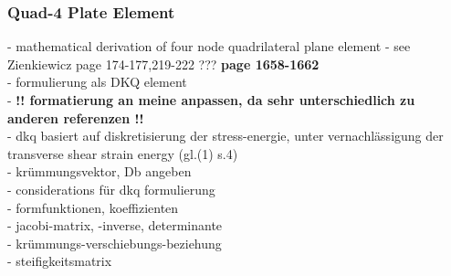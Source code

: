   \subsubsection{Quad-4 Plate Element}
  - mathematical derivation of four node quadrilateral plane element\newline
  - see Zienkiewicz \cite{zienkiewicz2000finite} page 174-177,219-222  \cite{zienkiewicz1977fem} ???  \textbf{\cite{batoz1982evaluation} page 1658-1662}\\
  - formulierung als DKQ element\\
  - \textbf{!! formatierung an meine anpassen, da sehr unterschiedlich zu anderen referenzen !!}\\
  - dkq basiert auf diskretisierung der stress-energie, unter vernachlässigung der transverse shear strain energy (gl.(1) s.4)\\
  - krümmungsvektor, Db angeben\\
  - considerations für dkq formulierung\\
  - formfunktionen, koeffizienten\\
  - jacobi-matrix, -inverse, determinante\\
  - krümmungs-verschiebungs-beziehung\\
  - steifigkeitsmatrix
